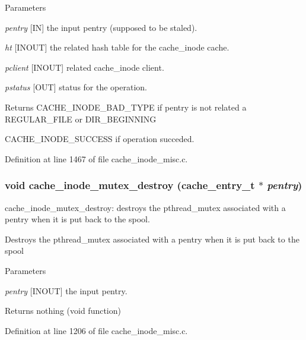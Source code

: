 \begin{DoxyParams}{Parameters}
\item[{\em pentry}][IN] the input pentry (supposed to be staled). \item[{\em ht}][INOUT] the related hash table for the cache\_\-inode cache. \item[{\em pclient}][INOUT] related cache\_\-inode client. \item[{\em pstatus}][OUT] status for the operation.\end{DoxyParams}
\begin{DoxyReturn}{Returns}
CACHE\_\-INODE\_\-BAD\_\-TYPE if pentry is not related a REGULAR\_\-FILE or DIR\_\-BEGINNING \par
 

CACHE\_\-INODE\_\-SUCCESS if operation succeded. 
\end{DoxyReturn}


Definition at line 1467 of file cache\_\-inode\_\-misc.c.
\subsubsection[{cache\_\-inode\_\-mutex\_\-destroy}]{\setlength{\rightskip}{0pt plus 5cm}void cache\_\-inode\_\-mutex\_\-destroy (cache\_\-entry\_\-t $\ast$ {\em pentry})}\label{cache__inode__misc_8c_a5c72fb619678af886176784ba7250b3c}
cache\_\-inode\_\-mutex\_\-destroy: destroys the pthread\_\-mutex associated with a pentry when it is put back to the spool.

Destroys the pthread\_\-mutex associated with a pentry when it is put back to the spool


\begin{DoxyParams}{Parameters}
\item[{\em pentry}][INOUT] the input pentry.\end{DoxyParams}
\begin{DoxyReturn}{Returns}
nothing (void function) 
\end{DoxyReturn}


Definition at line 1206 of file cache\_\-inode\_\-misc.c.
